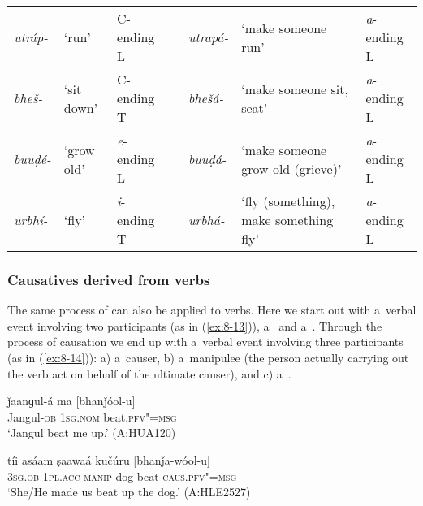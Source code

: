 \begin{table}[H]
\begin{tabularx}{\textwidth}{ l  P{10mm}  l  l  l  Q  l }

\textit{utráp-} &
`run' &
C-ending L &
\centering {\textgreater} &
\textit{utrapá-} &
`make someone run' &
\textit{a}-ending L\\
\textit{bheš-} &
`sit down' &
C-ending T &
\centering {\textgreater} &
\textit{bhešá-} &
`make someone sit, seat' &
\textit{a}-ending L\\
\textit{buuḍé-} &
`grow old' &
\textit{e}-ending L &
\centering {\textgreater}\par
&
\textit{buuḍá-} &
`make someone grow old (grieve)' &
\textit{a}-ending L\\
\textit{urbhí-} &
`fly'
&
{\textit{i}-ending T}
&
\centering {\textgreater}\par
&
\textit{urbhá-}
&
`fly (something), make something fly' &
{\textit{a}-ending L}
\\
\end{tabularx}
\end{table}

\subsubsection*{Causatives derived from  verbs}

The same process of  can also be applied to  verbs. Here we start out with a~verbal event involving two participants (as in (\ref{ex:8-13})), a~ and a~. Through the process of causation we end up with a~verbal event involving three participants (as in (\ref{ex:8-14})): a) a~causer, b) a~manipulee (the person actually carrying out the verb act on behalf of the ultimate causer), and c) a~.

\begin{exe}
\ex
\label{ex:8-13}
\gll ǰaanɡul-á ma [bhanǰóol-u] \\
Jangul-\textsc{ob} \textsc{1sg.nom} beat.\textsc{pfv"=msg} \\
\glt `Jangul beat me up.' (A:HUA120)
\end{exe}
\begin{exe}
\ex
\label{ex:8-14}
\gll tíi asáam ṣaawaá kučúru [bhanǰa-wóol-u] \\
\textsc{3sg.ob} \textsc{1pl.acc} \textsc{manip} dog beat-\textsc{caus.pfv"=msg} \\
\glt `She/He made us beat up the dog.' (A:HLE2527)
\end{exe}


